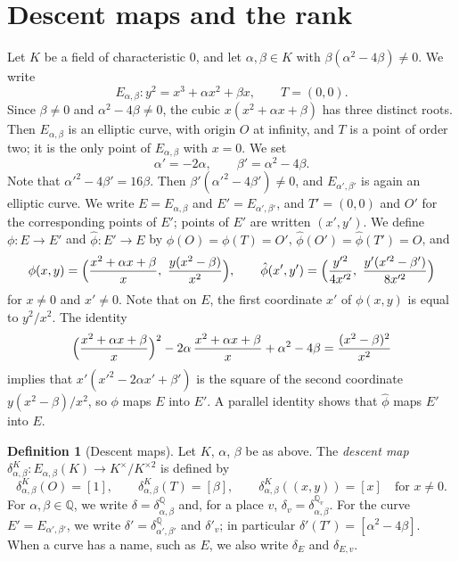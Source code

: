\documentclass[12pt,oneside,openany]{book}
\theoremstyle{definition}
\theoremstyle{plain}
\numberwithin{equation}{chapter}
\theoremstyle{plain}
\theoremstyle{definition}
\newtheorem{definition}[definition]{Definition}
\theoremstyle{remark}
\newcommand{\Q}{\mathbb Q}
\newcommand{\sq}[1]{[#1]}
\newcommand{\sqgp}[1]{#1^{\times}/#1^{\times2}}
\newcommand{\dual}{\hat\phi}
\begin{document}
\section{Descent maps and the rank}\label{sec:descent-maps}

Let $K$ be a field of characteristic $0$, and let $\alpha,\beta\in K$ with $\beta(\alpha^2-4\beta)\ne0$. We write
\begin{equation}\label{eq:E-alpha-beta}
E_{\alpha,\beta}\colon y^2=x^3+\alpha x^2+\beta x,\qquad T=(0,0).
\end{equation}
Since $\beta\ne0$ and $\alpha^2-4\beta\ne0$, the cubic $x(x^2+\alpha x+\beta)$ has three distinct roots. Then $E_{\alpha,\beta}$ is an elliptic curve, with origin $O$ at infinity, and $T$ is a point of order two; it is the only point of $E_{\alpha,\beta}$ with $x=0$. We set
\begin{equation}\label{eq:isogenous-coefficients}
\alpha'=-2\alpha,\qquad\beta'=\alpha^2-4\beta.
\end{equation}
Note that $\alpha'^2-4\beta'=16\beta$. Then $\beta'(\alpha'^2-4\beta')\ne0$, and $E_{\alpha',\beta'}$ is again an elliptic curve. We write $E=E_{\alpha,\beta}$ and $E'=E_{\alpha',\beta'}$, and $T'=(0,0)$ and $O'$ for the corresponding points of $E'$; points of $E'$ are written $(x',y')$. We define $\phi\colon E\to E'$ and $\dual\colon E'\to E$ by $\phi(O)=\phi(T)=O'$, $\dual(O')=\dual(T')=O$, and
\begin{equation}\label{eq:isogenies}
\phi(x,y)=\Bigl(\frac{x^2+\alpha x+\beta}{x},\ \frac{y(x^2-\beta)}{x^2}\Bigr),\qquad
\dual(x',y')=\Bigl(\frac{y'^2}{4x'^2},\ \frac{y'(x'^2-\beta')}{8x'^2}\Bigr)
\end{equation}
for $x\ne0$ and $x'\ne0$. Note that on $E$, the first coordinate $x'$ of $\phi(x,y)$ is equal to $y^2/x^2$. The identity
\begin{equation}\label{eq:phi-into-Eprime}
\Bigl(\frac{x^2+\alpha x+\beta}{x}\Bigr)^2-2\alpha\,\frac{x^2+\alpha x+\beta}{x}+\alpha^2-4\beta=\frac{(x^2-\beta)^2}{x^2}
\end{equation}
implies that $x'(x'^2-2\alpha x'+\beta')$ is the square of the second coordinate $y(x^2-\beta)/x^2$, so $\phi$ maps $E$ into $E'$. A parallel identity shows that $\dual$ maps $E'$ into $E$.

\begin{definition}[Descent maps]\label{def:descent-map}
Let $K$, $\alpha$, $\beta$ be as above. The \emph{descent map} $\delta^K_{\alpha,\beta}\colon E_{\alpha,\beta}(K)\to\sqgp K$ is defined by
\begin{equation}\label{eq:descent-map}
\delta^K_{\alpha,\beta}(O)=\sq1,\qquad\delta^K_{\alpha,\beta}(T)=\sq\beta,\qquad\delta^K_{\alpha,\beta}((x,y))=\sq x\quad\text{for }x\ne0.
\end{equation}
For $\alpha,\beta\in\Q$, we write $\delta=\delta^{\Q}_{\alpha,\beta}$ and, for a place $v$, $\delta_v=\delta^{\Q_v}_{\alpha,\beta}$. For the curve $E'=E_{\alpha',\beta'}$, we write $\delta'=\delta^{\Q}_{\alpha',\beta'}$ and $\delta'_v$; in particular $\delta'(T')=\sq{\alpha^2-4\beta}$. When a curve has a name, such as $E$, we also write $\delta_E$ and $\delta_{E,v}$.
\end{definition}
\end{document}
